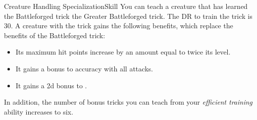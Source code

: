 \begin{feat}{Creature Handling Specialization}{Skill}
         You can teach a creature that has learned the Battleforged trick the Greater Battleforged trick.
        The DR to train the trick is 30.
        A creature with the trick gains the following benefits, which replace the benefits of the Battleforged trick:
        \begin{itemize}
            \item Its maximum hit points increase by an amount equal to twice its level.
            \item It gains a  bonus to accuracy with all attacks.
            \item It gains a \plus2d bonus to .
        \end{itemize}
        In addition, the number of bonus tricks you can teach from your \textit{efficient training} ability increases to six.
    \end{feat}

